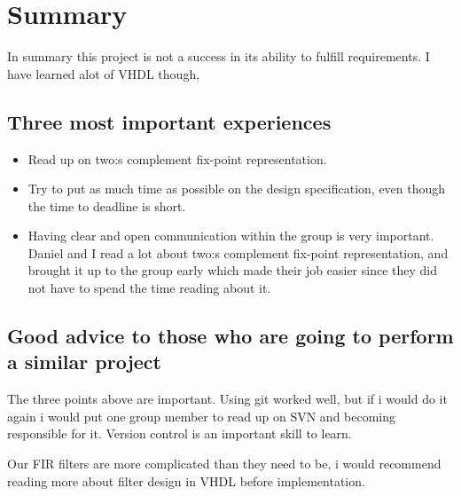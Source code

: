 \section{Summary}
In summary this project is not a success in its ability to fulfill requirements. I have learned alot of VHDL though, 

\subsection{Three most important experiences}
\begin{itemize}
  \item Read up on two:s complement fix-point representation.
  \item Try to put as much time as possible on the design specification, even though the time to deadline is short.
  \item Having clear and open communication within the group is very important. Daniel and I read a lot about two:s complement fix-point representation, and brought it up to the group early which made their job easier since they did not have to spend the time reading about it.
\end{itemize}

\subsection{Good advice to those who are going to perform a similar project}
The three points above are important. Using git worked well, but if i would do it again i would put one group member to read up on SVN and becoming responsible for it. Version control is an important skill to learn. 

Our FIR filters are more complicated than they need to be, i would recommend reading more about filter design in VHDL before implementation.
